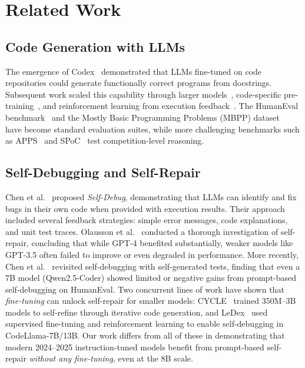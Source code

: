 \documentclass[conference]{IEEEtran}
\begin{document}
\section{Related Work}
\label{sec:related}

\subsection{Code Generation with LLMs}

The emergence of Codex~\cite{chen2021evaluating} demonstrated that LLMs fine-tuned on code repositories could generate functionally correct programs from docstrings. Subsequent work scaled this capability through larger models~\cite{li2022competition}, code-specific pre-training~\cite{roziere2024code}, and reinforcement learning from execution feedback~\cite{le2022coderl}. The HumanEval benchmark~\cite{chen2021evaluating} and the Mostly Basic Programming Problems (MBPP) dataset~\cite{austin2021program} have become standard evaluation suites, while more challenging benchmarks such as APPS~\cite{hendrycks2021measuring} and SPoC~\cite{kulal2019spoc} test competition-level reasoning.

\subsection{Self-Debugging and Self-Repair}

Chen et al.~\cite{chen2024teaching} proposed \emph{Self-Debug}, demonstrating that LLMs can identify and fix bugs in their own code when provided with execution results. Their approach included several feedback strategies: simple error messages, code explanations, and unit test traces. Olausson et al.~\cite{olausson2024selfrepair} conducted a thorough investigation of self-repair, concluding that while GPT-4 benefited substantially, weaker models like GPT-3.5 often failed to improve or even degraded in performance. More recently, Chen et al.~\cite{chen2025revisit} revisited self-debugging with self-generated tests, finding that even a 7B model (Qwen2.5-Coder) showed limited or negative gains from prompt-based self-debugging on HumanEval. Two concurrent lines of work have shown that \emph{fine-tuning} can unlock self-repair for smaller models: CYCLE~\cite{ding2024cycle} trained 350M--3B models to self-refine through iterative code generation, and LeDex~\cite{jiang2024ledex} used supervised fine-tuning and reinforcement learning to enable self-debugging in CodeLlama-7B/13B. Our work differs from all of these in demonstrating that modern 2024--2025 instruction-tuned models benefit from prompt-based self-repair \emph{without any fine-tuning}, even at the 8B scale.
\end{document}
